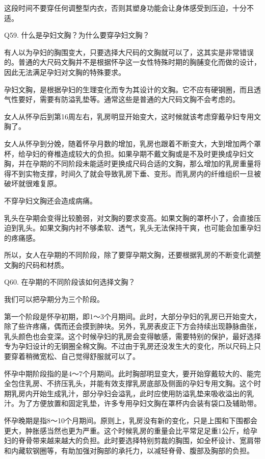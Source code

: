 \documentclass[12pt,UTF8]{ctexbook}
\begin{document}
这段时间不要穿任何调整型内衣，否则其塑身功能会让身体感受到压迫，十分不适。





Q59. 什么是孕妇文胸？为什么要穿孕妇文胸？


有人以为孕妇的胸围变大，只要选择大尺码的文胸就可以了，这其实是非常错误的。普通的大尺码文胸并不是根据怀孕这一女性特殊时期的胸脯变化而做的设计，因此无法满足孕妇对文胸的特殊要求。

孕妇文胸，是根据孕妇的生理变化而专为其设计的文胸。它不应有硬钢圈，而且透气性要好，需要有防溢乳垫等。通常这些是普通的大尺码文胸不会考虑的。

女人从怀孕后到第16周左右，乳房明显开始变大，这时候就该考虑穿戴孕妇专用文胸了。


女人从怀孕到分娩，随着怀孕月数的增加，乳房也跟着不断变大，大到增加两个罩杯，给孕妇的脊椎造成较大的负担。如果孕期不戴文胸或是不及时更换成孕妇文胸，并在孕期的不同阶段未能适时更换成尺码合适的文胸，那么增加的乳房重量将得不到实物支撑，时间久了就会导致乳房下垂、变形。而乳房内的纤维组织一旦被破坏就很难复原。

不穿孕妇文胸还会造成病痛。

乳头在孕期会变得比较脆弱，对文胸的要求变高。如果文胸的罩杯小了，会直接压迫到乳头。如果文胸内衬不够柔软、透气，乳头无法保持干爽，也可能会加重孕妇的疼痛感。

所以，女人在孕期的不同阶段，除了要穿孕期文胸，还要根据乳房的不断变化调整文胸的尺码和材质。





Q60. 在孕期的不同阶段该如何选择文胸？


我们可以把孕期分为三个阶段。

第一个阶段是怀孕初期，即1～3个月期间。此时，大部分孕妇的乳房已开始变大，除了些许疼痛，偶而还会摸到肿块。另外，乳房表皮正下方会持续出现静脉曲张，乳头颜色也会变深。这个时候孕妇的乳房会变得敏感，需要特别的保护，最好选择专为孕妇设计的无钢圈全棉文胸。不过由于乳房还没发生大的变化，所以尺码上只要穿着稍微宽松、自己觉得舒服就可以了。

怀孕中期阶段指的是4～7个月期间。此时胸部明显变大，要开始穿戴较大的、能完全包住乳房、不挤压乳头，并能有效支撑乳房底部及侧面的孕妇专用文胸。这个时期乳房内开始生成乳汁，部分孕妇会溢乳，此时应使用防溢乳垫来吸收溢出的乳汁。为了方便放置和固定乳垫，许多专用孕妇文胸在罩杯内会装有袋口及辅助带。

怀孕晚期是指8～10个月期间。原则上，乳房没有新的变化，只是上围和下围都会更大，肿胀感当然也更为严重。这个时候乳房的重量会比平常足足重1公斤，给孕妇的脊骨带来越来越大的负担。此时要选择特别剪裁的胸围，如全杯设计、宽肩带和内藏软钢圈等，有助加强对胸部的承托力，以减轻脊骨、腹部及胸部的负担。
\end{document}
